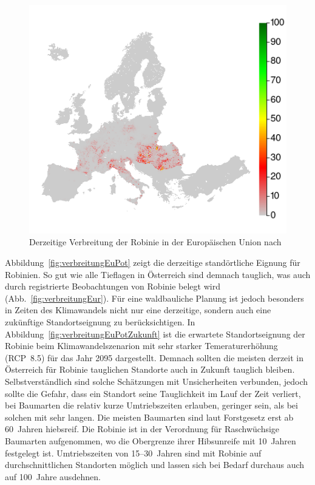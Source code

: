 \documentclass[twocolumn]{scrartcl}
\begin{document}
\begin{figure}[htbp]
  \centering
  \includegraphics[width=.9\linewidth]{./bild/verbreitungEuropa}
  \caption{Derzeitige Verbreitung der Robinie in der Europäischen Union nach \cite{jrc2016treeAtlas}}
  \label{fig:verbreitungEuJetzt}
\end{figure}

Abbildung~\ref{fig:verbreitungEuPot} zeigt die derzeitige standörtliche Eignung
für Robinien. So gut wie alle Tieflagen in Österreich sind demnach tauglich, was
auch durch registrierte Beobachtungen von Robinie belegt wird
(Abb.~\ref{fig:verbreitungEur}). Für eine waldbauliche Planung ist jedoch
besonders in Zeiten des Klimawandels nicht nur eine derzeitige, sondern auch
eine zukünftige Standortseignung zu berücksichtigen. In
Abbildung~\ref{fig:verbreitungEuPotZukunft} ist die erwartete Standortseignung
der Robinie beim Klimawandelszenarion mit sehr starker Temeraturerhöhung
(RCP~8.5) für das Jahr 2095 dargestellt. Demnach sollten die meisten derzeit in
Österreich für Robinie tauglichen Standorte auch in Zukunft tauglich bleiben.
Selbstverständlich sind solche Schätzungen mit Unsicherheiten verbunden, jedoch
sollte die Gefahr, dass ein Standort seine Tauglichkeit im Lauf der Zeit
verliert, bei Baumarten die relativ kurze Umtriebszeiten erlauben, geringer
sein, als bei solchen mit sehr langen. Die meisten Baumarten sind laut
Forstgesetz erst ab 60~Jahren hiebsreif. Die Robinie ist in der Verordnung für
Raschwüchsige Baumarten aufgenommen, wo die Obergrenze ihrer Hibsunreife mit
10~Jahren festgelegt ist. Umtriebszeiten von 15--30~Jahren sind mit Robinie auf
durchschnittlichen Standorten möglich und lassen sich bei Bedarf durchaus auch
auf 100~Jahre ausdehnen.
\end{document}
